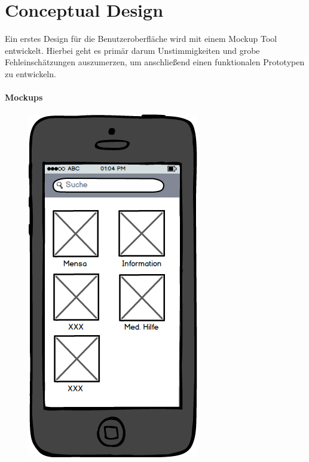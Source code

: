 \chapter{Conceptual Design}
Ein erstes Design für die Benutzeroberfläche wird mit einem Mockup Tool entwickelt. Hierbei geht es primär darum Unstimmigkeiten und grobe Fehleinschätzungen auszumerzen, um anschließend einen funktionalen Prototypen zu entwickeln.

\subsubsection*{Mockups}
\begin{figure}[h]
\centering
\begin{minipage}{.5\textwidth}
  \centering
  \includegraphics[width=.8\linewidth]{img/menu-mockup.png}

\end{minipage}
\end{figure}
